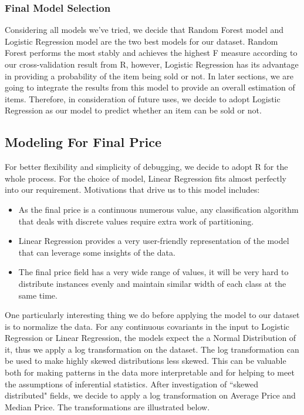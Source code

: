 \documentclass[CEJM,PDF]{cej} %
\begin{document}
\subsubsection{Final Model Selection}
Considering all models we've tried, we decide that Random Forest model and Logistic Regression model are the two best models for our dataset. Random Forest performs the most stably and achieves the highest F measure according to our cross-validation result from R, however, Logistic Regression has its advantage in providing a probability of the item being sold or not. In later sections, we are going to integrate the results from this model to provide an overall estimation of items. Therefore, in consideration of future uses, we decide to adopt Logistic Regression as our model to predict whether an item can be sold or not.\\

\subsection{Modeling For Final Price}
For better flexibility and simplicity of debugging, we decide to adopt R for the whole process. For the choice of model, Linear Regression fits almost perfectly into our requirement. Motivations that drive us to this model includes:
\begin{itemize}
\item As the final price is a continuous numerous value, any classification algorithm that deals with discrete values require extra work of partitioning.
\item Linear Regression provides a very user-friendly representation of the model that can leverage some insights of the data.
\item The final price field has a very wide range of values, it will be very hard to distribute instances evenly and maintain similar width of each class at the same time.
\end{itemize}

One particularly interesting thing we do before applying the model to our dataset is to normalize the data. For any continuous covariants in the input to Logistic Regression or Linear Regression, the models expect the a Normal Distribution of it, thus we apply a log transformation on the dataset. The log transformation can be used to make highly skewed distributions less skewed. This can be valuable both for making patterns in the data more interpretable and for helping to meet the assumptions of inferential statistics. After investigation of ``skewed distributed" fields, we decide to apply a log transformation on Average Price and Median Price. The transformations are illustrated below.\\
\end{document}
